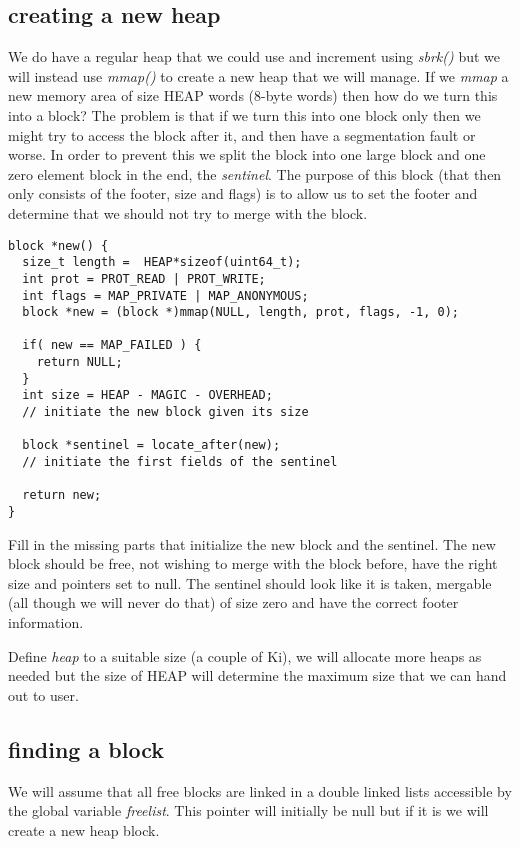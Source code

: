 \documentclass[a4paper,11pt]{article}
\begin{document}
 \subsection{creating a new heap}

 We do have a regular heap that we could use and increment using {\em
   sbrk()} but we will instead use {\em mmap()} to create a new heap
 that we will manage. If we {\em mmap} a new memory area of
 size HEAP words (8-byte words) then how do we turn this into a
 block? The problem is that if we turn this into one block only then
 we might try to access the block after it, and then have a segmentation
 fault or worse. In order to prevent this we split the block into one
 large block and one zero element block in the end, the {\em sentinel}. The
 purpose of this block (that then only consists of the footer, size
 and flags) is to allow us to set the footer and determine that we
 should not try to merge with the block.

 \begin{lstlisting}
block *new() {
  size_t length =  HEAP*sizeof(uint64_t);
  int prot = PROT_READ | PROT_WRITE;
  int flags = MAP_PRIVATE | MAP_ANONYMOUS;
  block *new = (block *)mmap(NULL, length, prot, flags, -1, 0);

  if( new == MAP_FAILED ) {
    return NULL;
  }
  int size = HEAP - MAGIC - OVERHEAD;
  // initiate the new block given its size 

  block *sentinel = locate_after(new);
  // initiate the first fields of the sentinel

  return new;
}
 \end{lstlisting}

 Fill in the missing parts that initialize the new block and the
 sentinel. The new block should be free, not wishing to merge with the
 block before, have the right size and pointers set to null. The
 sentinel should look like it is taken, mergable (all though we will
 never do that) of size zero and have the correct footer information.

 Define {\em heap} to a suitable size (a couple of Ki), we will allocate more
 heaps as needed but the size of HEAP will determine the maximum size
 that we can hand out to user.
 
 \subsection{finding a block}

 We will assume that all free blocks are linked in a double linked
 lists accessible by the global variable {\em freelist}. This pointer
 will initially be null but if it is we will create a new heap block.
\end{document}
